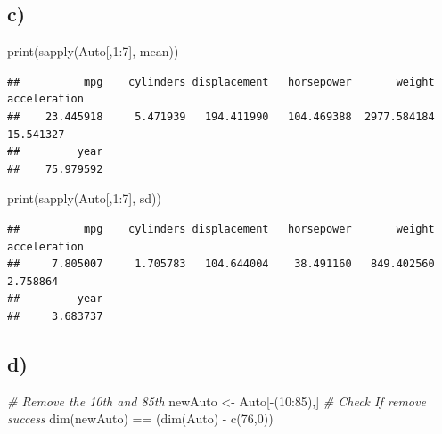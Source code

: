 \documentclass[
]{article}
\newenvironment{Shaded}{\begin{snugshade}}{\end{snugshade}}
\newcommand{\CommentTok}[1]{\textcolor[rgb]{0.56,0.35,0.01}{\textit{#1}}}
\newcommand{\DecValTok}[1]{\textcolor[rgb]{0.00,0.00,0.81}{#1}}
\newcommand{\FunctionTok}[1]{\textcolor[rgb]{0.00,0.00,0.00}{#1}}
\newcommand{\NormalTok}[1]{#1}
\newcommand{\OtherTok}[1]{\textcolor[rgb]{0.56,0.35,0.01}{#1}}
\newcommand{\SpecialCharTok}[1]{\textcolor[rgb]{0.00,0.00,0.00}{#1}}
\begin{document}
\hypertarget{c-5}{%
\subsection{c)}\label{c-5}}

\begin{Shaded}
\begin{Highlighting}[]
\FunctionTok{print}\NormalTok{(}\FunctionTok{sapply}\NormalTok{(Auto[,}\DecValTok{1}\SpecialCharTok{:}\DecValTok{7}\NormalTok{], mean))}
\end{Highlighting}
\end{Shaded}

\begin{verbatim}
##          mpg    cylinders displacement   horsepower       weight acceleration 
##    23.445918     5.471939   194.411990   104.469388  2977.584184    15.541327 
##         year 
##    75.979592
\end{verbatim}

\begin{Shaded}
\begin{Highlighting}[]
\FunctionTok{print}\NormalTok{(}\FunctionTok{sapply}\NormalTok{(Auto[,}\DecValTok{1}\SpecialCharTok{:}\DecValTok{7}\NormalTok{], sd))}
\end{Highlighting}
\end{Shaded}

\begin{verbatim}
##          mpg    cylinders displacement   horsepower       weight acceleration 
##     7.805007     1.705783   104.644004    38.491160   849.402560     2.758864 
##         year 
##     3.683737
\end{verbatim}

\hypertarget{d-2}{%
\subsection{d)}\label{d-2}}

\begin{Shaded}
\begin{Highlighting}[]
\CommentTok{\# Remove the 10th and 85th}
\NormalTok{newAuto }\OtherTok{\textless{}{-}}\NormalTok{ Auto[}\SpecialCharTok{{-}}\NormalTok{(}\DecValTok{10}\SpecialCharTok{:}\DecValTok{85}\NormalTok{),]}
\CommentTok{\# Check If remove success}
\FunctionTok{dim}\NormalTok{(newAuto) }\SpecialCharTok{==}\NormalTok{ (}\FunctionTok{dim}\NormalTok{(Auto) }\SpecialCharTok{{-}} \FunctionTok{c}\NormalTok{(}\DecValTok{76}\NormalTok{,}\DecValTok{0}\NormalTok{))}
\end{Highlighting}
\end{Shaded}
\end{document}
